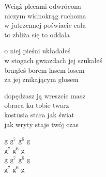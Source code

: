 \begin{text}
    Wciąż plecami odwrócona\\
    niczym widnokrąg ruchoma\\
    w jutrzennej poświacie cała\\
    to zbliża się to oddala

    o niej pieśni układałeś\\
    w stogach gwiazdach jej szukałeś\\
    brnąłeś borem lasem losem\\
    za jej znikającym głosem

    dopędzasz ją wreszcie masz\\
    obraca ku tobie twarz\\
    kostusia stara jak świat\\
    jak wryty staje twój czas
\end{text}
\begin{chord}
    g $\mathrm{g^{7}}$ $\mathrm{g^{6}}$ g\\
    $\mathrm{g^{7}}$ $\mathrm{g^{6}}$ g\\
    g $\mathrm{g^{7}}$ $\mathrm{g^{6}}$ g\\
    $\mathrm{g^{7}}$ $\mathrm{g^{6}}$ g
\end{chord}

